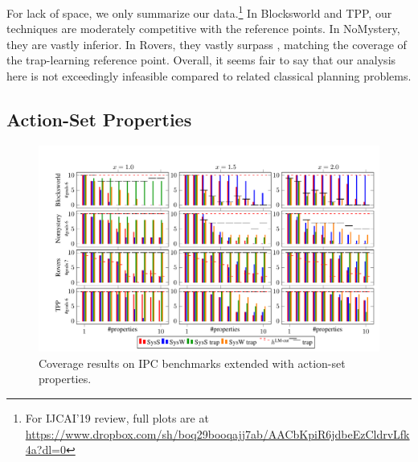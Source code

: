 For lack of space, we only summarize our data.\footnote{For IJCAI'19
review, full plots are at
{\scriptsize \url{https://www.dropbox.com/sh/boq29booqajj7ab/AACbKpiR6jdbeEzCldrvLfk4a?dl=0}}}
%
%
In Blocksworld and TPP, our techniques are moderately competitive with
the reference points. In NoMystery, they are vastly inferior. In
Rovers, they vastly surpass \hlmcut, matching the coverage of the
trap-learning reference point. Overall, it seems fair to say that our
analysis here is not exceedingly infeasible compared to related
classical planning problems.




\fi









\ifdefined\longflagdefined

\subsection{Action-Set Properties}

\begin{figure}[htb]
\centering\centering
%
\includegraphics{data/action_set_properties/barchart/barchart.pdf}
\vspace{-0.6cm}
\caption{Coverage results on IPC benchmarks extended with action-set properties.}
\label{fig:barcharts}
\vspace{-0.2cm}
\end{figure}

